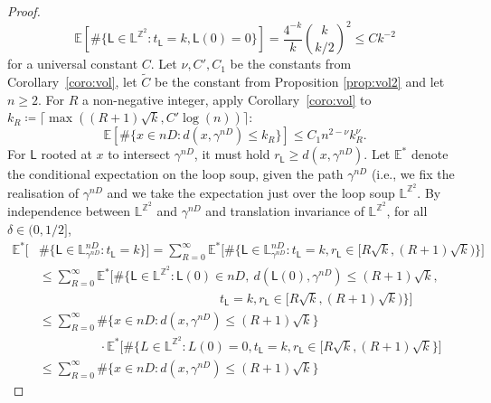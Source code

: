 \documentclass[11pt]{article}
\begin{document}
\begin{proof}
    \begin{equation}
    \label{eq:temp:mass}
    \mathbb{E}[\# \{ \mathsf{L}\in \mathbb{L}^{\mathbb{Z}^2}: t_\mathsf{L}=k, \mathsf{L}(0)=0 \} ] =\frac{4^{-k}}{k}\binom{k}{k/2}^2 \leq Ck^{-2}
    \end{equation}
    for a universal constant $C$.
    Let $\nu, C',C_1$ be the constants from Corollary~\ref{coro:vol}, let $\tilde C$ be the constant from Proposition \ref{prop:vol2} and let $n\geq 2$.
    For $R$ a non-negative integer, apply Corollary~\ref{coro:vol} to $k_R\coloneqq\lceil \max((R+1)\sqrt{k},  C' \log(n) )\rceil $:
    \begin{equation}
    \label{eq:temp:card}
    \mathbb{E}[\#\{ x\in n D: d(x,\gamma^{nD})\leq k_R  \}] \leq C_1  n^{2-\nu} k_R^{\nu}.
    \end{equation}
    For $\mathsf{L}$ rooted at $x$ to intersect $\gamma^{nD}$, it must hold $r_\mathsf{L}\geq d(x,\gamma^{nD})$. Let $\mathbb{E}^*$ denote the conditional expectation on the loop soup, given the path $\gamma^{nD}$ (i.e., we fix the realisation of $\gamma^{nD}$ and we take the expectation just over the loop soup $\mathbb{L}^{\mathbb{Z}^2}$. 
    By independence between $\mathbb{L}^{\mathbb{Z}^2}$ and $\gamma^{nD}$ and translation invariance of $\mathbb{L}^{\mathbb{Z}^2}$, for all $\delta\in(0,1/2]$, 
    \begin{align*}
    \mathbb{E}^*\Big[ &\#   \{   \mathsf{L}\in \mathbb{L}^{nD}_{\gamma^{nD}}: t_\mathsf{L}=k \}  \Big]
    = \sum_{R=0}^\infty
    \mathbb{E}^*\big[\# \{\mathsf{L}\in  \mathbb{L}^{nD}_{\gamma^{nD} } : t_\mathsf{L}=k, r_{\mathsf{L}}\in [R\sqrt{k}, (R+1)\sqrt{k}   )   \} \big]\\
    &	\leq \sum_{R=0}^\infty
    \mathbb{E}^*\big[\# \{\mathsf{L}\in  \mathbb{L}^{\mathbb{Z}^2} :
    \mathsf{L}(0)\in nD, \
    d(\mathsf{L}(0),\gamma^{nD})\leq (R+1)\sqrt{k}, \\
    &\hspace{6cm}
    t_\mathsf{L}=k, r_{\mathsf{L}}\in [R\sqrt{k}, (R+1)\sqrt{k}   )   \} \big]\\
    &	\leq \sum_{R=0}^\infty  \#
    \{  x\in n D : d(x,\gamma^{nD} )\leq  (R+1) \sqrt{k}  \}
    \\
    &\hspace{2cm}\cdot \mathbb{E}^*\big[\# \{L\in \mathbb{L}^{\mathbb{Z}^2}: L(0)=0, t_\mathsf{L}=k, r_{\mathsf{L}}\in [R\sqrt{k}, (R+1)\sqrt{k}  \} \big]\\
    &	\leq \sum_{R=0}^\infty  \#
    \big\{  x\in n D : d(x,\gamma^{nD} )\leq  (R+1) \sqrt{k}  \big\}

\end{align*}
\end{proof}
\end{document}
